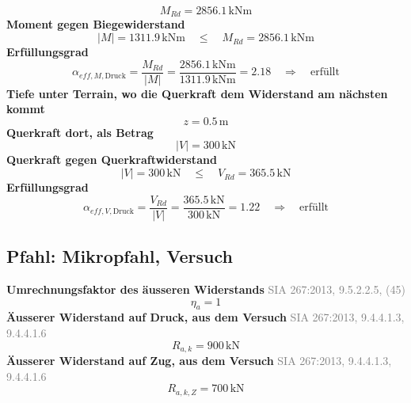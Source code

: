 \documentclass[11pt,a4paper]{article}
\newcommand{\normref}[1]{{\small\textcolor{gray}{#1}}}
\begin{document}
\begin{equation*}
M_{Rd} = 2856.1\,\mathrm{kNm}
\end{equation*}
\noindent\textbf{Moment gegen Biegewiderstand}
\begin{equation*}
\left|M\right| = 1311.9\,\mathrm{kNm} \quad \le \quad M_{Rd} = 2856.1\,\mathrm{kNm}
\end{equation*}
\noindent\textbf{Erfüllungsgrad}
\begin{equation*}
\alpha_{eff,M,\text{Druck}} = \frac{M_{Rd}}{\left|M\right|} = \frac{2856.1\,\mathrm{kNm}}{1311.9\,\mathrm{kNm}} = 2.18 \quad \Rightarrow \quad \text{erfüllt}
\end{equation*}
\noindent\textbf{Tiefe unter Terrain, wo die Querkraft dem Widerstand am nächsten kommt}
\begin{equation*}
z = 0.5\,\mathrm{m}
\end{equation*}
\noindent\textbf{Querkraft dort, als Betrag}
\begin{equation*}
\left|V\right| = 300\,\mathrm{kN}
\end{equation*}
\noindent\textbf{Querkraft gegen Querkraftwiderstand}
\begin{equation*}
\left|V\right| = 300\,\mathrm{kN} \quad \le \quad V_{Rd} = 365.5\,\mathrm{kN}
\end{equation*}
\noindent\textbf{Erfüllungsgrad}
\begin{equation*}
\alpha_{eff,V,\text{Druck}} = \frac{V_{Rd}}{\left|V\right|} = \frac{365.5\,\mathrm{kN}}{300\,\mathrm{kN}} = 1.22 \quad \Rightarrow \quad \text{erfüllt}
\end{equation*}
\subsection{Pfahl: Mikropfahl, Versuch}
\noindent\textbf{Umrechnungsfaktor des äusseren Widerstands} \hfill \normref{SIA 267:2013, 9.5.2.2.5, (45)}
\begin{equation*}
\eta_a = 1
\end{equation*}
\noindent\textbf{Äusserer Widerstand auf Druck, aus dem Versuch} \hfill \normref{SIA 267:2013, 9.4.4.1.3, 9.4.4.1.6}
\begin{equation*}
R_{a,k} = 900\,\mathrm{kN}
\end{equation*}
\noindent\textbf{Äusserer Widerstand auf Zug, aus dem Versuch} \hfill \normref{SIA 267:2013, 9.4.4.1.3, 9.4.4.1.6}
\begin{equation*}
R_{a,k,Z} = 700\,\mathrm{kN}
\end{equation*}
\end{document}
